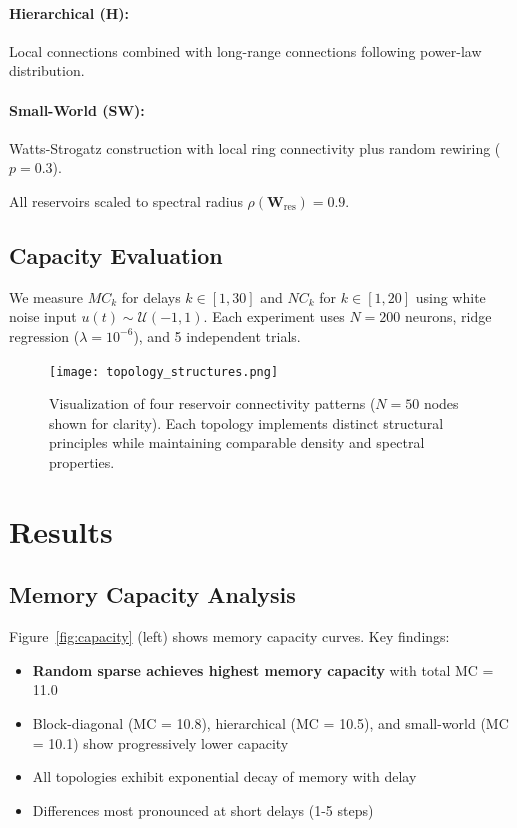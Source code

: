 \documentclass[11pt]{article}
\begin{document}
\paragraph{Hierarchical (H):} Local connections combined with long-range connections following power-law distribution.

\paragraph{Small-World (SW):} Watts-Strogatz construction with local ring connectivity plus random rewiring ($p=0.3$).

All reservoirs scaled to spectral radius $\rho(\mathbf{W}_{\text{res}}) = 0.9$.

\subsection{Capacity Evaluation}

We measure $MC_k$ for delays $k \in [1, 30]$ and $NC_k$ for $k \in [1, 20]$ using white noise input $u(t) \sim \mathcal{U}(-1, 1)$. Each experiment uses $N=200$ neurons, ridge regression ($\lambda = 10^{-6}$), and 5 independent trials.

\begin{figure}[t]
\centering
\texttt{[image: topology\_structures.png]}
\caption{Visualization of four reservoir connectivity patterns ($N=50$ nodes shown for clarity). Each topology implements distinct structural principles while maintaining comparable density and spectral properties.}
\label{fig:topologies}
\end{figure}

\section{Results}

\subsection{Memory Capacity Analysis}

Figure~\ref{fig:capacity} (left) shows memory capacity curves. Key findings:

\begin{itemize}
\item \textbf{Random sparse achieves highest memory capacity} with total MC = 11.0
\item Block-diagonal (MC = 10.8), hierarchical (MC = 10.5), and small-world (MC = 10.1) show progressively lower capacity
\item All topologies exhibit exponential decay of memory with delay
\item Differences most pronounced at short delays (1-5 steps)
\end{itemize}
\end{document}
